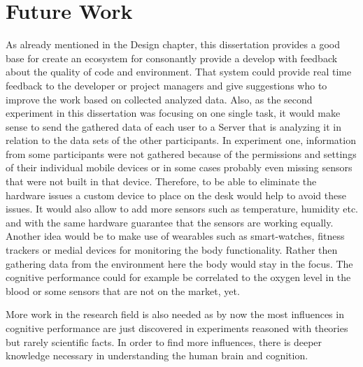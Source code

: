 \section{Future Work}
As already mentioned in the Design chapter, this dissertation provides a good base for create an ecosystem for consonantly provide a develop with feedback about the quality of code and environment. That system could provide real time feedback to the developer or project managers and give suggestions who to improve the work based on collected analyzed data. 
Also, as the second experiment in this dissertation was focusing on one single task, it would make sense to send the gathered data of each user to a Server that is analyzing it in relation to the data sets of the other participants. 
In experiment one, information from some participants were not gathered because of the permissions and settings of their individual mobile devices or in some cases probably even missing sensors that were not built in that device. 
Therefore, to be able to eliminate the hardware issues a custom device to place on the desk would help to avoid these issues. It would also allow to add more sensors such as temperature, humidity etc. and with the same hardware guarantee that the sensors are working equally. 
Another idea would be to make use of wearables such as smart-watches, fitness trackers or medial devices for monitoring the body functionality. Rather then gathering data from the environment here the body would stay in the focus. The cognitive performance could for example be correlated to the oxygen level in the blood or some sensors that are not on the market, yet. 

More work in the research field is also needed as by now the most influences in cognitive performance are just discovered in experiments reasoned with theories but rarely scientific facts. In order to find more influences, there is deeper knowledge necessary in understanding the human brain and cognition. 

